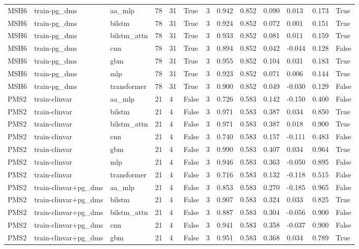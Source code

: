 \begin{table}[t]
\begin{tabular}{lllllllllllll}
MSH6 & train-pg\_dms & aa\_mlp & 78 & 31 & True & 3 & 0.942 & 0.852 & 0.090 & 0.013 & 0.173 & True \\
MSH6 & train-pg\_dms & bilstm & 78 & 31 & True & 3 & 0.924 & 0.852 & 0.072 & 0.001 & 0.151 & True \\
MSH6 & train-pg\_dms & bilstm\_attn & 78 & 31 & True & 3 & 0.933 & 0.852 & 0.081 & 0.011 & 0.159 & True \\
MSH6 & train-pg\_dms & cnn & 78 & 31 & True & 3 & 0.894 & 0.852 & 0.042 & -0.044 & 0.128 & False \\
MSH6 & train-pg\_dms & gbm & 78 & 31 & True & 3 & 0.955 & 0.852 & 0.104 & 0.031 & 0.183 & True \\
MSH6 & train-pg\_dms & mlp & 78 & 31 & True & 3 & 0.923 & 0.852 & 0.071 & 0.006 & 0.144 & True \\
MSH6 & train-pg\_dms & transformer & 78 & 31 & True & 3 & 0.900 & 0.852 & 0.049 & -0.030 & 0.129 & False \\
PMS2 & train-clinvar & aa\_mlp & 21 & 4 & False & 3 & 0.726 & 0.583 & 0.142 & -0.150 & 0.400 & False \\
PMS2 & train-clinvar & bilstm & 21 & 4 & False & 3 & 0.971 & 0.583 & 0.387 & 0.034 & 0.850 & True \\
PMS2 & train-clinvar & bilstm\_attn & 21 & 4 & False & 3 & 0.971 & 0.583 & 0.387 & 0.018 & 0.900 & True \\
PMS2 & train-clinvar & cnn & 21 & 4 & False & 3 & 0.740 & 0.583 & 0.157 & -0.111 & 0.483 & False \\
PMS2 & train-clinvar & gbm & 21 & 4 & False & 3 & 0.990 & 0.583 & 0.407 & 0.034 & 0.964 & True \\
PMS2 & train-clinvar & mlp & 21 & 4 & False & 3 & 0.946 & 0.583 & 0.363 & -0.050 & 0.895 & False \\
PMS2 & train-clinvar & transformer & 21 & 4 & False & 3 & 0.716 & 0.583 & 0.132 & -0.118 & 0.515 & False \\
PMS2 & train-clinvar+pg\_dms & aa\_mlp & 21 & 4 & False & 3 & 0.853 & 0.583 & 0.270 & -0.185 & 0.965 & False \\
PMS2 & train-clinvar+pg\_dms & bilstm & 21 & 4 & False & 3 & 0.907 & 0.583 & 0.324 & 0.033 & 0.825 & True \\
PMS2 & train-clinvar+pg\_dms & bilstm\_attn & 21 & 4 & False & 3 & 0.887 & 0.583 & 0.304 & -0.056 & 0.900 & False \\
PMS2 & train-clinvar+pg\_dms & cnn & 21 & 4 & False & 3 & 0.941 & 0.583 & 0.358 & -0.037 & 0.900 & False \\
PMS2 & train-clinvar+pg\_dms & gbm & 21 & 4 & False & 3 & 0.951 & 0.583 & 0.368 & 0.034 & 0.789 & True \\

\end{tabular}
\end{table}
